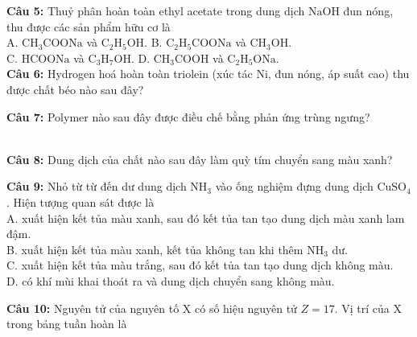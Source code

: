 \documentclass[12pt,a4paper]{article}
\begin{document}
\noindent \textbf{Câu 5:} Thuỷ phân hoàn toàn ethyl acetate trong dung dịch $\text{NaOH}$ đun nóng, thu được các sản phẩm hữu cơ là\\
\noindent A. $\text{CH}_3\text{COONa}$ và $\text{C}_2\text{H}_5\text{OH}$. \hfill B. $\text{C}_2\text{H}_5\text{COONa}$ và $\text{CH}_3\text{OH}$.\\
\noindent C. $\text{HCOONa}$ và $\text{C}_3\text{H}_7\text{OH}$. \hfill D. $\text{CH}_3\text{COOH}$ và $\text{C}_2\text{H}_5\text{ONa}$.\\

\noindent \textbf{Câu 6:} Hydrogen hoá hoàn toàn triolein (xúc tác $\text{Ni}$, đun nóng, áp suất cao) thu được chất béo nào sau đây?\\
\noindent{}

\noindent \textbf{Câu 7:} Polymer nào sau đây được điều chế bằng phản ứng trùng ngưng?\\
\noindent{}\\
\noindent{}

\noindent \textbf{Câu 8:} Dung dịch của chất nào sau đây làm quỳ tím chuyển sang màu xanh?\\
\noindent{}

\noindent \textbf{Câu 9:} Nhỏ từ từ đến dư dung dịch $\text{NH}_3$ vào ống nghiệm đựng dung dịch $\text{CuSO}_4$. Hiện tượng quan sát được là\\
\noindent A. xuất hiện kết tủa màu xanh, sau đó kết tủa tan tạo dung dịch màu xanh lam đậm.\\
\noindent B. xuất hiện kết tủa màu xanh, kết tủa không tan khi thêm $\text{NH}_3$ dư.\\
\noindent C. xuất hiện kết tủa màu trắng, sau đó kết tủa tan tạo dung dịch không màu.\\
\noindent D. có khí mùi khai thoát ra và dung dịch chuyển sang không màu.

\noindent \textbf{Câu 10:} Nguyên tử của nguyên tố X có số hiệu nguyên tử $Z = 17$. Vị trí của X trong bảng tuần hoàn là\\
\noindent{}\\
\noindent{}
\end{document}
